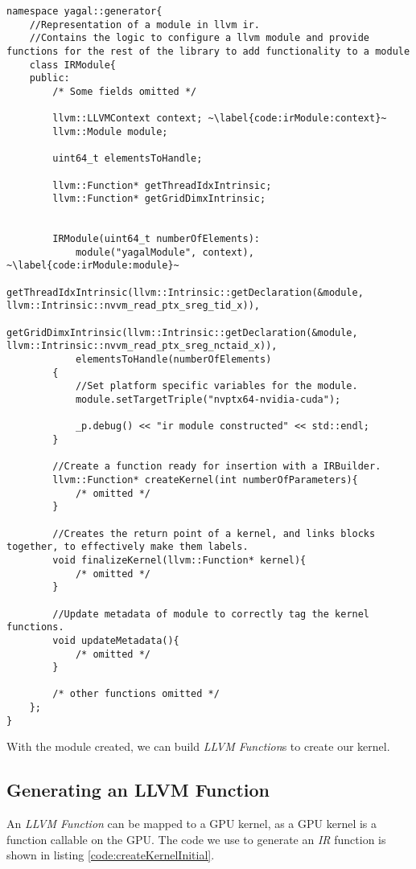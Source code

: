 \begin{lstlisting}[caption={The IRModule class.}, label={code:irModule}]
namespace yagal::generator{
    //Representation of a module in llvm ir.
    //Contains the logic to configure a llvm module and provide functions for the rest of the library to add functionality to a module
    class IRModule{
    public:
        /* Some fields omitted */

        llvm::LLVMContext context; ~\label{code:irModule:context}~
        llvm::Module module;

        uint64_t elementsToHandle;

        llvm::Function* getThreadIdxIntrinsic;
        llvm::Function* getGridDimxIntrinsic;


        IRModule(uint64_t numberOfElements): 
            module("yagalModule", context), ~\label{code:irModule:module}~
            getThreadIdxIntrinsic(llvm::Intrinsic::getDeclaration(&module, llvm::Intrinsic::nvvm_read_ptx_sreg_tid_x)),
            getGridDimxIntrinsic(llvm::Intrinsic::getDeclaration(&module, llvm::Intrinsic::nvvm_read_ptx_sreg_nctaid_x)),
            elementsToHandle(numberOfElements)
        {
            //Set platform specific variables for the module.
            module.setTargetTriple("nvptx64-nvidia-cuda");

            _p.debug() << "ir module constructed" << std::endl;
        }

        //Create a function ready for insertion with a IRBuilder.
        llvm::Function* createKernel(int numberOfParameters){
            /* omitted */
        }

        //Creates the return point of a kernel, and links blocks together, to effectively make them labels.
        void finalizeKernel(llvm::Function* kernel){
            /* omitted */
        }

        //Update metadata of module to correctly tag the kernel functions.
        void updateMetadata(){
            /* omitted */
        }

        /* other functions omitted */
    };
}
\end{lstlisting}

With the module created, we can build \textit{LLVM Function}s to create our kernel.

\subsection{Generating an LLVM Function} \label{sec:irFunction}
An \textit{LLVM Function} can be mapped to a GPU kernel, as a GPU kernel is a function callable on the GPU. The code we use to generate an \textit{IR} function is shown in listing \ref{code:createKernelInitial}. 

